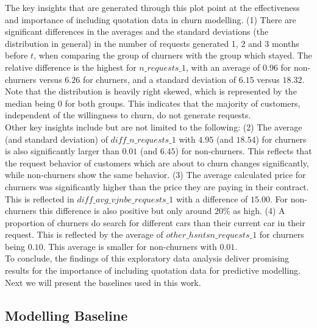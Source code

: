 \documentclass[12pt,titlepage]{article}
\begin{document}
The key insights that are generated through this plot point at the effectiveness and importance of including quotation data in churn modelling. (1) There are significant differences in the averages and the standard deviations (the distribution in general) in the number of requests generated 1, 2 and 3 months before $t$, when comparing the group of churners with the group which stayed. The relative difference is the highest for $n\_requests\_1$, with an average of $0.96$ for non-churners versus $6.26$ for churners, and a standard deviation of $6.15$ versus $18.32$. Note that the distribution is heavily right skewed, which is represented by the median being $0$ for both groups. This indicates that the majority of customers, independent of the willingness to churn, do not generate requests. \\
Other key insights include but are not limited to the following: (2) The average (and standard deviation) of $diff\_n\_requests\_1$ with $4.95$ (and $18.54$) for churners is also significantly larger than $0.01$ (and $6.45$) for non-churners. This reflects that the request behavior of customers which are about to churn changes significantly, while non-churners show the same behavior. (3) The average calculated price for churners was significantly higher than the price they are paying in their contract. This is reflected in $diff\_avg\_vjnbe\_requests\_1$ with a difference of $15.00$. For non-churners this difference is also positive but only around $20\%$ as high. (4) A proportion of churners do search for different cars than their current car in their request. This is reflected by the average of $other\_hsntsn\_requests\_1$ for churners being $0.10$. This average is smaller for non-churners with $0.01$. \\
To conclude, the findings of this exploratory data analysis deliver promising results for the importance of including quotation data for predictive modelling. Next we will present the baselines used in this work.

\subsection{Modelling Baseline} \par
\end{document}
